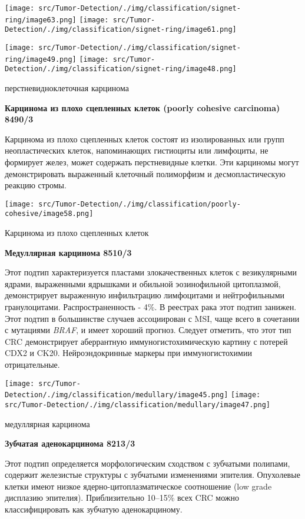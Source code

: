 \documentclass[
  russian,
  12pt,
  a4paper,
]{report}
\begin{document}
\texttt{[image: src/Tumor-Detection/./img/classification/signet-ring/image63.png]}
\texttt{[image: src/Tumor-Detection/./img/classification/signet-ring/image61.png]}

\texttt{[image: src/Tumor-Detection/./img/classification/signet-ring/image49.png]}
\texttt{[image: src/Tumor-Detection/./img/classification/signet-ring/image48.png]}

перстневидноклеточная карцинома

\textbf{Карцинома из плохо сцепленных клеток (poorly cohesive carcinoma)
8490/3}

Карцинома из плохо сцепленных клеток состоят из изолированных или групп
неопластических клеток, напоминающих гистиоциты или лимфоциты, не
формирует желез, может содержать перстневидные клетки. Эти карциномы
могут демонстрировать выраженный клеточный полиморфизм и
десмопластическую реакцию стромы.

\texttt{[image: src/Tumor-Detection/./img/classification/poorly-cohesive/image58.png]}

Карцинома из плохо сцепленных клеток

\textbf{Медуллярная карцинома 8510/3}

Этот подтип характеризуется пластами злокачественных клеток с
везикулярными ядрами, выраженными ядрышками и обильной эозинофильной
цитоплазмой, демонстрирует выраженную инфильтрацию лимфоцитами и
нейтрофильными гранулоцитами. Распространенность - 4\%. В реестрах рака
этот подтип занижен. Этот подтип в большинстве случаев ассоциирован с
MSI, чаще всего в сочетании с мутациями \emph{BRAF}, и имеет хороший
прогноз. Следует отметить, что этот тип CRC демонстрирует аберрантную
иммуногистохимическую картину с потерей CDX2 и CK20. Нейроэндокринные
маркеры при иммуногистохимии отрицательные.

\texttt{[image: src/Tumor-Detection/./img/classification/medullary/image45.png]}
\texttt{[image: src/Tumor-Detection/./img/classification/medullary/image47.png]}

медуллярная карцинома

\textbf{Зубчатая аденокарцинома 8213/3}

Этот подтип определяется морфологическим сходством с зубчатыми полипами,
содержит железистые структуры с зубчатыми изменениями эпителия.
Опухолевые клетки имеют низкое ядерно-цитоплазматическое соотношение
(low grade дисплазию эпителия). Приблизительно 10--15\% всех CRC можно
классифицировать как зубчатую аденокарциному.
\end{document}
